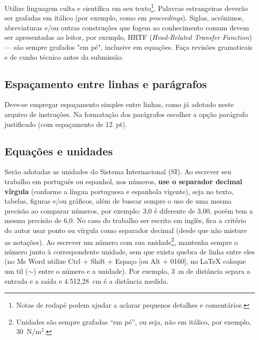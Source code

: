 \documentclass[12pt, a4paper, twoside, onecolumn]{article}
\begin{document}

Utilize linguagem culta e científica em seu texto\footnote{Notas de rodapé podem ajudar a aclarar pequenos detalhes e comentários.}. Palavras estrangeiras deverão ser grafadas em itálico (por exemplo, como em \textit{proceedings}). Siglas, acrônimos, abreviaturas e/ou outras construções que fogem ao conhecimento comum devem ser apresentadas ao leitor, por exemplo, HRTF (\textit{Head-Related Transfer Function}) --- são sempre grafados "em pé", inclusive em equações.
Faça revisões gramaticais e de cunho técnico antes da submissão.

\subsection{Espaçamento entre linhas e parágrafos}

Deve-se empregar espaçamento simples entre linhas, como já adotado neste arquivo de instruções.
Na formatação dos parágrafos escolher a opção parágrafo justificado (com espaçamento de 12~pt).


\subsection{Equações e unidades}

Serão adotadas as unidades do Sistema Internacional (SI). Ao escrever seu trabalho em português ou espanhol, nos números, \textbf{use o separador decimal vírgula} (conforme a língua portuguesa e espanhola vigente), seja no texto, tabelas, figuras e/ou gráficos, além de buscar sempre o uso de uma mesma precisão ao comparar números, por exemplo: 3,0 é diferente de 3,00, porém tem a mesma precisão de 6,0. 
No caso do trabalho ser escrito em inglês, fica a critério do autor usar ponto ou vírgula como separador decimal (desde que não misture as notações).
Ao escrever um número com sua unidade\footnote{Unidades são sempre grafadas ``em pé'', ou seja, não em itálico, por exemplo, 30~N/m$^2$.}, mantenha sempre o número junto à correspondente unidade, sem que exista quebra de linha entre eles (no Ms Word utilize Ctrl + Shift + Espaço [ou Alt + 0160], no \LaTeX\xspace coloque um til ($\sim$) entre o número e a unidade). Por exemplo, 3~m de distância separa a entrada e a saída e 4.512,28~cm é a distância medida.
\end{document}
